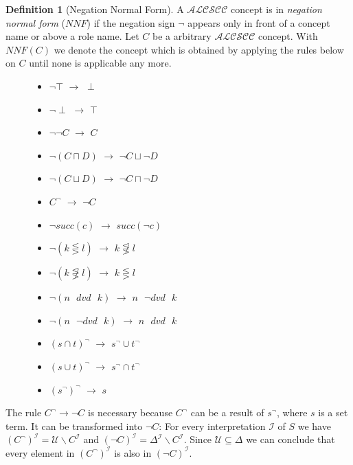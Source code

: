 \documentclass[a4paper,11pt]{scrartcl}
\theoremstyle{break}
\theoremstyle{definition}
\newtheorem{mydef}{Definition}
\begin{document}
\begin{mydef}[Negation Normal Form]
A $\mathcal{ALCSCC}$ concept is in \textit{negation normal form} ($NNF$) if the negation sign $\neg$ appears only in front of a concept name or above a role name. Let $C$ be a arbitrary $\mathcal{ALCSCC}$ concept. With $NNF(C)$ we denote the concept which is obtained by applying the rules below on $C$ until none is applicable any more.
\begin{figure}[H]
\begin{minipage}[t]{.5\textwidth}
\raggedright
\begin{itemize}
\item $\neg\top$ $\rightarrow$ $\perp$
\item $\neg\perp$ $\rightarrow$ $\top$
\item $\neg\neg C$ $\rightarrow$ $C$
\item $\neg(C\sqcap D)$ $\rightarrow$ $\neg C \sqcup \neg D$
\item $\neg(C\sqcup D)$ $\rightarrow$ $\neg C \sqcap \neg D$
\item $C^\neg$ $\rightarrow$ $\neg C$
\item $\neg succ(c)$ $\rightarrow$ $succ(\neg c)$
\end{itemize}
\end{minipage}%
\begin{minipage}[t]{.5\textwidth}
\raggedleft
\begin{itemize}
\item $\neg (k\lesseqgtr l)$ $\rightarrow$ $k\not\lesseqgtr l$
\item $\neg (k\not\lesseqgtr l)$ $\rightarrow$ $k\lesseqgtr l$
\item $\neg (n\text{ } dvd \text{ } k)$ $\rightarrow$ $n\text{ } \neg dvd \text{ } k$
\item $\neg (n\text{ } \neg dvd \text{ } k)$ $\rightarrow$ $n\text{ } dvd \text{ } k$
\item $(s\cap t)^\neg$ $\rightarrow$ $s^\neg \cup t^\neg$
\item $(s\cup t)^\neg$ $\rightarrow$ $s^\neg \cap t^\neg$
\item $(s^\neg)^\neg$ $\rightarrow$ $s$
\end{itemize}
\end{minipage}
\end{figure}
\end{mydef}
The rule $C^\neg\rightarrow \neg C$ is necessary because $C^\neg$ can be a result of $s^\neg$, where $s$ is a set term. It can be transformed into $\neg C$: For every interpretation $\mathcal{I}$ of $S$ we have $(C^\neg)^\mathcal{I}=\mathcal{U}\backslash C^\mathcal{I}$ and $(\neg C)^\mathcal{I}=\Delta^\mathcal{I}\backslash C^\mathcal{I}$. Since $\mathcal{U}\subseteq \Delta$ we can conclude that every element in $(C^\neg)^\mathcal{I}$ is also in $(\neg C)^\mathcal{I}$.\\
\end{document}
